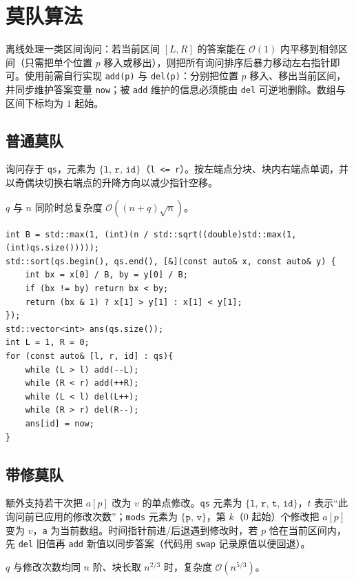 \section{莫队算法}

离线处理一类区间询问：若当前区间 $[L,R]$ 的答案能在 $\mathcal{O}(1)$ 内平移到相邻区间（只需把单个位置 $p$ 移入或移出），则把所有询问排序后暴力移动左右指针即可。使用前需自行实现 \verb|add(p)| 与 \verb|del(p)|：分别把位置 $p$ 移入、移出当前区间，并同步维护答案变量 \texttt{now}；被 \verb|add| 维护的信息必须能由 \verb|del| 可逆地删除。数组与区间下标均为 $1$ 起始。

\subsection{普通莫队}

询问存于 \verb|qs|，元素为 $\texttt{\{l, r, id\}}$（\verb|l <= r|）。按左端点分块、块内右端点单调，并以奇偶块切换右端点的升降方向以减少指针空移。

$q$ 与 $n$ 同阶时总复杂度 $\mathcal{O}((n+q)\sqrt n)$。

\begin{lstlisting}
int B = std::max(1, (int)(n / std::sqrt((double)std::max(1, (int)qs.size()))));
std::sort(qs.begin(), qs.end(), [&](const auto& x, const auto& y) {
    int bx = x[0] / B, by = y[0] / B;
    if (bx != by) return bx < by;
    return (bx & 1) ? x[1] > y[1] : x[1] < y[1];
});
std::vector<int> ans(qs.size());
int L = 1, R = 0;
for (const auto& [l, r, id] : qs){
    while (L > l) add(--L);
    while (R < r) add(++R);
    while (L < l) del(L++);
    while (R > r) del(R--);
    ans[id] = now;
}
\end{lstlisting}

\subsection{带修莫队}

额外支持若干次把 $a[p]$ 改为 $v$ 的单点修改。\verb|qs| 元素为 $\texttt{\{l, r, t, id\}}$，$t$ 表示“此询问前已应用的修改次数”；\verb|mods| 元素为 $\texttt{\{p, v\}}$，第 $k$（$0$ 起始）个修改把 $a[p]$ 变为 $v$，\texttt{a} 为当前数组。时间指针前进/后退遇到修改时，若 $p$ 恰在当前区间内，先 \verb|del| 旧值再 \verb|add| 新值以同步答案（代码用 \texttt{swap} 记录原值以便回退）。

$q$ 与修改次数均同 $n$ 阶、块长取 $n^{2/3}$ 时，复杂度 $\mathcal{O}(n^{5/3})$。


